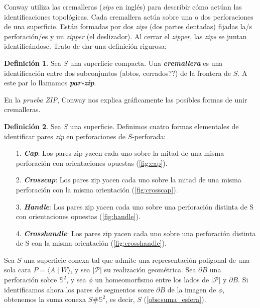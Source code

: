 \documentclass[10pt]{report}
\newcommand{\Esfera}{\mathbb{S}^2}
\newcommand{\enfatiza}[1]{\textbf{\textit{#1}}}
\theoremstyle{definition}
\newtheorem{defin}{Definición}[section]
\begin{document}
Conway utiliza las cremalleras (\textit{zips} en inglés) para describir cómo actúan las identificaciones topológicas. Cada cremallera actúa sobre una o dos perforaciones de una superficie. Están formadas por dos \textit{zips} (dos partes dentadas) fijadas la/s perforación/es y un \textit{zipper} (el deslizador). Al cerrar el \textit{zipper}, las \textit{zips} se juntan identificándose. Trato de dar una definición rigurosa:


\begin{defin}%
Sea $S$ una superficie compacta. Una \enfatiza{cremallera} es una identificación entre dos subconjuntos (abtos, cerrados??) de la frontera de $S$. A este par lo llamamos \enfatiza{par-zip}.
\end{defin}


En la \textit{prueba ZIP}, Conway nos explica gráficamente las posibles formas de unir cremalleras. 

\begin{defin}
Sea $S$ una superficie. Definimos cuatro formas elementales de identificar pares \textit{zip} en perforaciones de 
$S$-perforada:

\begin{itemize}
\item[1.] \enfatiza{Cap}: Los pares zip yacen cada uno sobre la mitad de una misma perforación con orientaciones opuestas (\autoref{fig:cap}).
\item[2.] \enfatiza{Crosscap}: Los pares zip yacen cada uno sobre la mitad de una misma perforación con la misma orientación (\autoref{fig:crosscap}).
\item[3.] \enfatiza{Handle}: Los pares zip yacen cada uno sobre una perforación distinta de S con orientaciones opuestas (\autoref{fig:handle}).
\item[4.] \enfatiza{Crosshandle}: Los pares zip yacen cada uno sobre una perforación distinta de S con la misma orientación (\autoref{fig:crosshandle}).
\end{itemize}
\end{defin}

Sea $S$ una superficie conexa tal que admite una representación poligonal de una sola cara $P=\langle A\mid W\rangle$, y sea $|\mathcal{P}|$ su realización geométrica. Sea $\partial B$ una perforación sobre $\Esfera$, y sea $\phi$ un homeomorfismo entre los lados de $|\mathcal{P}|$ y $\partial B$. Si identificamos ahora los pares de segmentos sonre $\partial B$ de la imagen de $\phi$, obtenemos la suma conexa $S\# \Esfera$, es decir, $S$ (\autoref{obs:suma_esfera}). 
\end{document}
